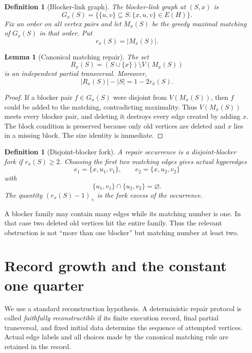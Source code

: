 \documentclass[11pt]{article}
\newtheorem{lemma}[theorem]{Lemma}
\newtheorem{definition}[theorem]{Definition}
\begin{document}
\begin{definition}[Blocker-link graph]
The blocker-link graph at \((S,x)\) is
\[
  G_x(S)=\bigl\{\{u,v\}\subseteq S:\{x,u,v\}\in E(H)\bigr\}.
\]
Fix an order on all vertex pairs and let \(M_x(S)\) be the greedy maximal
matching of \(G_x(S)\) in that order.  Put
\[
  r_x(S)=|M_x(S)|.
\]
\end{definition}

\begin{lemma}[Canonical matching repair]\label{lem:matching-repair}
The set
\[
  R_x(S)=(S\cup\{x\})\setminus V(M_x(S))
\]
is an independent partial transversal.  Moreover,
\[
  |R_x(S)|-|S|=1-2r_x(S).
\]
\end{lemma}

\begin{proof}
If a blocker pair \(f\in G_x(S)\) were disjoint from \(V(M_x(S))\), then
\(f\) could be added to the matching, contradicting maximality.  Thus
\(V(M_x(S))\) meets every blocker pair, and deleting it destroys every edge
created by adding \(x\).  The block condition is preserved because only old
vertices are deleted and \(x\) lies in a missing block.  The size identity is
immediate.
\end{proof}

\begin{definition}[Disjoint-blocker fork]
A repair occurrence is a disjoint-blocker fork if \(r_x(S)\ge2\).  Choosing
the first two matching edges gives actual hyperedges
\[
  e_1=\{x,u_1,v_1\},\qquad e_2=\{x,u_2,v_2\}
\]
with
\[
  \{u_1,v_1\}\cap\{u_2,v_2\}=\varnothing.
\]
The quantity \((r_x(S)-1)_+\) is the fork excess of the occurrence.
\end{definition}

A blocker family may contain many edges while its matching number is one.  In
that case two deleted old vertices hit the entire family.  Thus the relevant
obstruction is not ``more than one blocker'' but matching number at least two.

\section{Record growth and the constant one quarter}

We use a standard reconstruction hypothesis.  A deterministic repair protocol
is called \emph{faithfully reconstructible} if its finite execution record,
final partial transversal, and fixed initial data determine the sequence of
attempted vertices.  Actual edge labels and all choices made by the canonical
matching rule are retained in the record.
\end{document}

